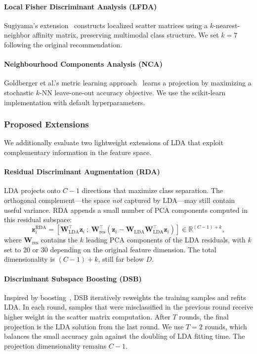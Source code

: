 \paragraph{Local Fisher Discriminant Analysis (LFDA)} Sugiyama's extension~\cite{sugiyama2007lfda} constructs localized scatter matrices using a $k$-nearest-neighbor affinity matrix, preserving multimodal class structure. We set $k = 7$ following the original recommendation.

\paragraph{Neighbourhood Components Analysis (NCA)} Goldberger et al.'s metric learning approach~\cite{goldberger2004nca} learns a projection by maximizing a stochastic $k$-NN leave-one-out accuracy objective. We use the scikit-learn implementation with default hyperparameters.

\subsubsection{Proposed Extensions}

We additionally evaluate two lightweight extensions of LDA that exploit complementary information in the feature space.

\paragraph{Residual Discriminant Augmentation (RDA)} LDA projects onto $C-1$ directions that maximize class separation. The orthogonal complement---the space \emph{not} captured by LDA---may still contain useful variance. RDA appends a small number of PCA components computed in this residual subspace:
\begin{equation}
\mathbf{z}_i^{\text{RDA}} = \left[\mathbf{W}_{\text{LDA}}^\top\mathbf{z}_i \ ;\ \mathbf{W}_{\text{res}}^\top(\mathbf{z}_i - \mathbf{W}_{\text{LDA}}\mathbf{W}_{\text{LDA}}^\top\mathbf{z}_i)\right] \in \mathbb{R}^{(C-1)+k},
\end{equation}
where $\mathbf{W}_{\text{res}}$ contains the $k$ leading PCA components of the LDA residuals, with $k$ set to 20 or 30 depending on the original feature dimension. The total dimensionality is $(C-1) + k$, still far below $D$.

\paragraph{Discriminant Subspace Boosting (DSB)} Inspired by boosting~\cite{freund1997decision}, DSB iteratively reweights the training samples and refits LDA. In each round, samples that were misclassified in the previous round receive higher weight in the scatter matrix computation. After $T$ rounds, the final projection is the LDA solution from the last round. We use $T=2$ rounds, which balances the small accuracy gain against the doubling of LDA fitting time. The projection dimensionality remains $C-1$.

